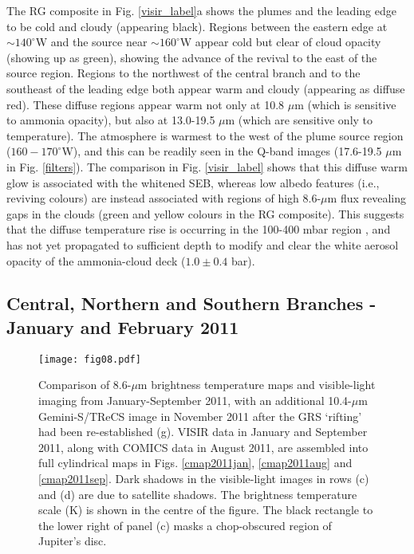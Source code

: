 \documentclass[final,authoryear,5p,times,twocolumn]{elsarticle}
\begin{document}
The RG composite in Fig. \ref{visir_label}a shows the plumes and the leading edge to be cold and cloudy (appearing black).  Regions between the eastern edge at $\sim140^\circ$W and the source near $\sim160^\circ$W appear cold but clear of cloud opacity (showing up as green), showing the advance of the revival to the east of the source region.  Regions to the northwest of the central branch and to the southeast of the leading edge both appear warm and cloudy (appearing as diffuse red).   These diffuse regions appear warm not only at 10.8 $\mu$m (which is sensitive to ammonia opacity), but also at 13.0-19.5 $\mu$m (which are sensitive only to temperature). The atmosphere is warmest to the west of the plume source region ($160-170^\circ$W), and this can be readily seen in the Q-band images (17.6-19.5 $\mu$m in Fig. \ref{filters}).  The comparison in Fig. \ref{visir_label} shows that this diffuse warm glow is associated with the whitened SEB, whereas low albedo features (i.e., reviving colours) are instead associated with regions of high 8.6-$\mu$m flux revealing gaps in the clouds (green and yellow colours in the RG composite).  This suggests that the diffuse temperature rise is occurring in the 100-400 mbar region \citep[within the upper tropospheric hazes of][]{12perezhoyos}, and has not yet propagated to sufficient depth to modify and clear the white aerosol opacity of the ammonia-cloud deck ($1.0\pm0.4$ bar).

\subsection{Central, Northern and Southern Branches - January and February 2011}
\label{seq3}

\begin{figure*}
\begin{centering}
\centerline{\texttt{[image: fig08.pdf]}}
\caption{Comparison of 8.6-$\mu$m brightness temperature maps and visible-light imaging from January-September 2011, with an additional 10.4-$\mu$m Gemini-S/TReCS image in November 2011 after the GRS `rifting' had been re-established (g).  VISIR data in January and September 2011, along with COMICS data in August 2011, are assembled into full cylindrical maps in Figs. \ref{cmap2011jan}, \ref{cmap2011aug} and \ref{cmap2011sep}.  Dark shadows in the visible-light images in rows (c) and (d) are due to satellite shadows. The brightness temperature scale (K) is shown in the centre of the figure.  The black rectangle to the lower right of panel (c) masks a chop-obscured region of Jupiter's disc.}
\label{montage2011}
\end{centering}
\end{figure*}
\end{document}

